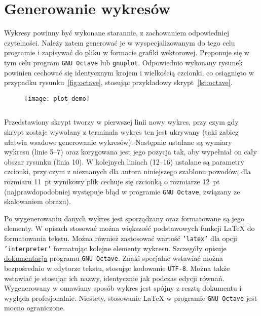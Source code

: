 \chapter{Generowanie wykresów}

Wykresy powinny być wykonane starannie, z zachowaniem odpowiedniej czytelności. Należy zatem generować je w wyspecjalizowanym do tego celu programie i zapisywać do pliku w formacie grafiki wektorowej. Proponuje się w tym celu program \texttt{GNU Octave} lub \texttt{gnuplot}. Odpowiednio wykonany rysunek powinien cechować się identycznym krojem i wielkością czcionki, co osiągnięto w przypadku rysunku~\ref{fig:octave}, stosując przykładowy skrypt~\ref{lst:octave}.

\begin{figure}[htb!]
\centering
\texttt{[image: plot\_demo]}
\end{figure}

\begin{listing}[hbt!]
\inputminted[linenos, breaklines]{octave}{skrypty/plot_demo.m}
\end{listing}

Przedstawiony skrypt tworzy w pierwszej linii nowy wykres, przy czym gdy skrypt zostaje wywołany z terminala wykres ten jest ukrywany (taki zabieg ułatwia wsadowe generowanie wykresów). Następnie ustalane są wymiary wykresu (linie 5--7) oraz korygowana jest jego pozycja tak, aby wypełniał on cały obszar rysunku (linia 10). W kolejnych liniach (12--16) ustalane są parametry czcionki, przy czym z nieznanych dla autora niniejszego szablonu powodów, dla rozmiaru \qty{11}{pt} wynikowy plik cechuje się czcionką o rozmiarze \qty{12}{pt} (najprawdopodobniej występuje błąd w programie \texttt{GNU Octave}, związany ze skalowaniem obrazu).

Po wygenerowaniu danych wykres jest sporządzany oraz formatowane są jego elementy. W opisach stosować można większość podstawowych funkcji \LaTeX{} do formatowania tekstu. Można również zastosować wartość \texttt{'latex'} dla opcji \texttt{'interpreter'} formatując kolejne elementy wykresu. Szczegóły opisuje \href{https://docs.octave.org/latest}{dokumentacja} programu \texttt{GNU Octave}. Znaki specjalne wstawiać można bezpośrednio w edytorze tekstu, stosując kodowanie \texttt{UTF-8}. Można także wstawiać je stosując ich nazwy, identycznie jak podczas edycji równań. Wygenerowany w omawiany sposób wykres jest spójny z resztą dokumentu i wygląda profesjonalnie. Niestety, stosowanie \LaTeX{} w programie \texttt{GNU Octave} jest mocno ograniczone.

